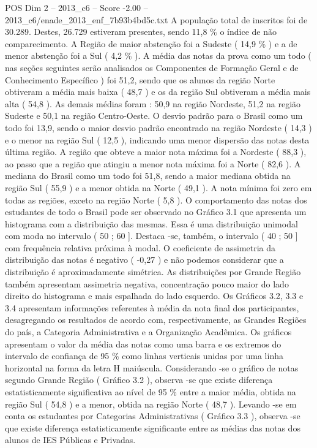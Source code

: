 \begin{textsample}{POS Dim 2 – 2013\_c6 – Score -2.00 – 2013\_c6/enade\_2013\_enf\_7b93b4bd5c.txt}
A população total de inscritos foi de 30.289.
Destes, 26.729 estiveram presentes, sendo 11,8 \% o índice de não comparecimento.
A Região de maior abstenção foi a Sudeste ( 14,9 \% ) e a de menor abstenção foi a Sul ( 4,2 \% ).
A média das notas da prova como um todo ( nas seções seguintes serão analisados os Componentes de Formação Geral e de Conhecimento Específico ) foi 51,2, sendo que os alunos da região Norte obtiveram a média mais baixa ( 48,7 ) e os da região Sul obtiveram a média mais alta ( 54,8 ).
As demais médias foram : 50,9 na região Nordeste, 51,2 na região Sudeste e 50,1 na região Centro-Oeste.
O desvio padrão para o Brasil como um todo foi 13,9, sendo o maior desvio padrão encontrado na região Nordeste ( 14,3 ) e o menor na região Sul ( 12,5 ), indicando uma menor dispersão das notas desta última região.
A região que obteve a maior nota máxima foi a Nordeste ( 88,3 ), ao passo que a região que atingiu a menor nota máxima foi a Norte ( 82,6 ).
A mediana do Brasil como um todo foi 51,8, sendo a maior mediana obtida na região Sul ( 55,9 ) e a menor obtida na Norte ( 49,1 ).
A nota mínima foi zero em todas as regiões, exceto na região Norte ( 5,8 ).
O comportamento das notas dos estudantes de todo o Brasil pode ser observado no Gráfico 3.1 que apresenta um histograma com a distribuição das mesmas.
Essa é uma distribuição unimodal com moda no intervalo ( 50 ; 60 ].
Destaca -se, também, o intervalo ( 40 ; 50 ] com frequência relativa próxima à modal.
O coeficiente de assimetria da distribuição das notas é negativo ( -0,27 ) e não podemos considerar que a distribuição é aproximadamente simétrica.
As distribuições por Grande Região também apresentam assimetria negativa, concentração pouco maior do lado direito do histograma e mais espalhada do lado esquerdo.
Os Gráficos 3.2, 3.3 e 3.4 apresentam informações referentes à média da nota final dos participantes, desagregando os resultados de acordo com, respectivamente, as Grandes Regiões do país, a Categoria Administrativa e a Organização Acadêmica.
Os gráficos apresentam o valor da média das notas como uma barra e os extremos do intervalo de confiança de 95 \% como linhas verticais unidas por uma linha horizontal na forma da letra H maiúscula.
Considerando -se o gráfico de notas segundo Grande Região ( Gráfico 3.2 ), observa -se que existe diferença estatisticamente significativa ao nível de 95 \% entre a maior média, obtida na região Sul ( 54,8 ) e a menor, obtida na região Norte ( 48,7 ).
Levando -se em conta os estudantes por Categorias Administrativas ( Gráfico 3.3 ), observa -se que existe diferença estatisticamente significante entre as médias das notas dos alunos de IES Públicas e Privadas.

\end{textsample}
